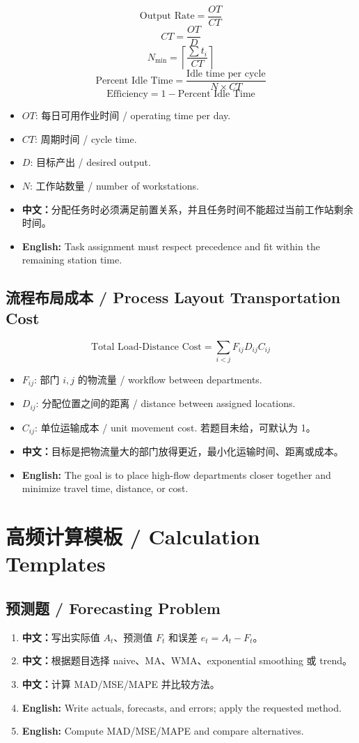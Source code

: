 \documentclass[11pt,a4paper]{ctexart}
\newcommand{\cn}[1]{\textbf{中文：}#1}
\newcommand{\en}[1]{\textbf{English:} #1}
\begin{document}
\[
\text{Output Rate}=\frac{OT}{CT}
\]
\[
CT=\frac{OT}{D}
\]
\[
N_{\min}=\left\lceil \frac{\sum t_i}{CT}\right\rceil
\]
\[
\text{Percent Idle Time}=
\frac{\text{Idle time per cycle}}{N \times CT}
\]
\[
\text{Efficiency}=1-\text{Percent Idle Time}
\]

\begin{itemize}
  \item $OT$: 每日可用作业时间 / operating time per day.
  \item $CT$: 周期时间 / cycle time.
  \item $D$: 目标产出 / desired output.
  \item $N$: 工作站数量 / number of workstations.
  \item \cn{分配任务时必须满足前置关系，并且任务时间不能超过当前工作站剩余时间。}
  \item \en{Task assignment must respect precedence and fit within the remaining station time.}
\end{itemize}

\subsection{流程布局成本 / Process Layout Transportation Cost}
\[
\text{Total Load-Distance Cost}=\sum_{i<j}F_{ij}D_{ij}C_{ij}
\]
\begin{itemize}
  \item $F_{ij}$: 部门 $i,j$ 的物流量 / workflow between departments.
  \item $D_{ij}$: 分配位置之间的距离 / distance between assigned locations.
  \item $C_{ij}$: 单位运输成本 / unit movement cost. 若题目未给，可默认为 1。
  \item \cn{目标是把物流量大的部门放得更近，最小化运输时间、距离或成本。}
  \item \en{The goal is to place high-flow departments closer together and minimize travel time, distance, or cost.}
\end{itemize}

\section{高频计算模板 / Calculation Templates}

\subsection{预测题 / Forecasting Problem}
\begin{enumerate}
  \item \cn{写出实际值 $A_t$、预测值 $F_t$ 和误差 $e_t=A_t-F_t$。}
  \item \cn{根据题目选择 naive、MA、WMA、exponential smoothing 或 trend。}
  \item \cn{计算 MAD/MSE/MAPE 并比较方法。}
  \item \en{Write actuals, forecasts, and errors; apply the requested method.}
  \item \en{Compute MAD/MSE/MAPE and compare alternatives.}
\end{enumerate}
\end{document}
